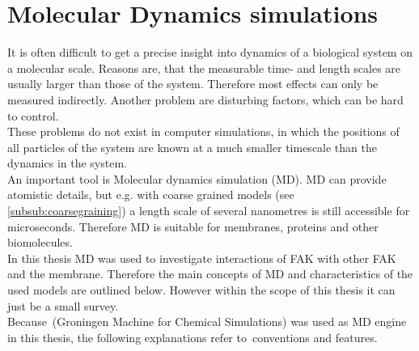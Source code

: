 \section{Molecular Dynamics simulations}
It is often difficult to get a precise insight into dynamics of a biological system on a molecular scale. Reasons are, that the measurable time- and length scales are usually larger than those of the system. Therefore most effects can only be measured indirectly. Another problem are disturbing factors, which can be hard to control.\\
These problems do not exist in computer simulations, in which the positions of all particles of the system are known at a much smaller timescale than the dynamics in the system.\\
An important tool is Molecular dynamics simulation (MD). MD can provide atomistic details, but e.g. with coarse grained models (see \autoref{subsub:coarsegraining}) a length scale of several nanometres is still accessible for microseconds. Therefore MD is suitable for membranes, proteins and other biomolecules.\\
In this thesis MD was used to investigate interactions of FAK with other FAK and the membrane. Therefore the main concepts of MD and characteristics of the used models are outlined below. However within the scope of this thesis it can just be a small survey.\\
Because \gromacs\,(Groningen Machine for Chemical Simulations) \autocites{gromacs1, gromacsManual} was used as MD engine in this thesis, the following explanations refer to \gromacs\,conventions and features.
